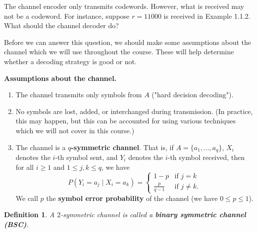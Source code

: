 \documentclass[10pt]{article}
\theoremstyle{newstyle}
\newtheorem{defn}[thm]{Definition}
\begin{document}
The channel encoder only transmits codewords. However, what is received may not be a codeword. 
For instance, suppose $r = 11000$ is received in Example 1.1.2. What should the channel decoder do? 

Before we can answer this question, we should make some assumptions about the channel 
which we will use throughout the course. These will help determine whether a decoding strategy 
is good or not.

{\bf Assumptions about the channel.} 
\begin{enumerate}[(1)]
    \item The channel transmits only symbols from $A$ ("hard decision decoding").
    \item No symbols are lost, added, or interchanged during transmission. 
    (In practice, this may happen, but this can be accounted for using various techniques 
    which we will not cover in this course.)
    \item The channel is a {\bf $q$-symmetric channel}. That is, if
    $A = \{a_1, \dots, a_q\}$, $X_i$ denotes the $i$-th symbol sent, and 
    $Y_i$ denotes the $i$-th symbol received, then for all $i \geq 1$ and 
    $1 \leq j, k \leq q$, we have 
    \[ P(Y_i = a_j \mid X_i = a_k) = \begin{cases} 1-p & \text{if } j=k \\ 
    \frac{p}{q-1} & \text{if } j\neq k. \end{cases} \]
    We call $p$ the {\bf symbol error probability} of the channel (we have $0 \leq p \leq 1$).
\end{enumerate}

\begin{defn}
A $2$-symmetric channel is called a {\bf binary symmetric channel (BSC)}.
\end{defn}
\end{document}
